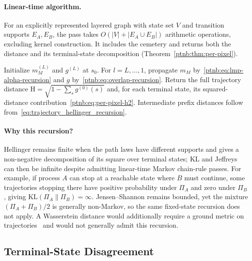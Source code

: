 \paragraph{Linear-time algorithm.}\label{ptnb:sec:lmp-hellinger-backward}

For an explicitly represented layered graph with state set $V$ and transition supports $E_A,E_B$, the pass takes $O(|V|+|E_A\cup E_B|)$ arithmetic operations, excluding kernel construction. It includes the cemetery and returns both the distance and its terminal-state decomposition (Theorem~\ref{ptnb:thm:per-pixel}).

\begin{algorithm}[H]
    \caption{Hellinger backward pass (with per-terminal-state disagreement map)}
    \label{ptnb:alg:hellinger}\label{ptnb:alg:hellinger-backward}
Initialize $m_M^{(L)}$ and $g^{(L)}$ at $s_0$. For $l=L,\ldots,1$, propagate $m_M$ by~\eqref{ptnb:eq:lmp-alpha-recursion} and $g$ by~\eqref{ptnb:eq:overlap-recursion}. Return the full trajectory distance $\mathrm H=\sqrt{1-\sum_sg^{(0)}(s)}$ and, for each terminal state, its squared-distance contribution~\eqref{ptnb:eq:per-pixel-h2}. Intermediate prefix distances follow from~\eqref{eq:trajectory_hellinger_recursion}.

\end{algorithm}

\paragraph{Why this recursion?}
Hellinger remains finite when the path laws have different supports and gives a non-negative decomposition of its square over terminal states; KL and Jeffreys can then be infinite despite admitting linear-time Markov chain-rule passes. For example, if process $A$ can stop at a reachable state where $B$ must continue, some trajectories stopping there have positive probability under $\Pi_A$ and zero under $\Pi_B$, giving $\mathrm{KL}(\Pi_A\|\Pi_B)=\infty$. Jensen--Shannon remains bounded, yet the mixture $(\Pi_A+\Pi_B)/2$ is generally non-Markov, so the same fixed-state recursion does not apply. A Wasserstein distance would additionally require a ground metric on trajectories~\parencite{PeyreCuturi2019OptimalTransport} and would not generally admit this recursion.

\subsection{Terminal-State Disagreement}\label{ptnb:sec:lmp-disagreement}

